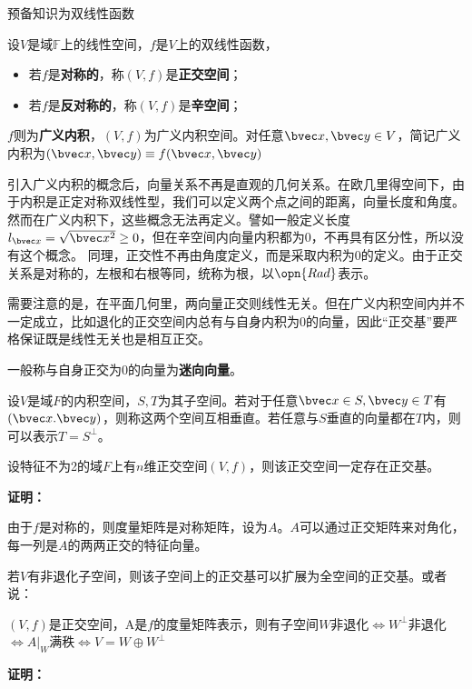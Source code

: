 

\begin{issues}
\issueDraft 预备知识为双线性函数
\end{issues}

\begin{definition}{}
设$V$是域$\mathbb F$上的线性空间，$f$是$V$上的双线性函数，
\begin{itemize}
\item 若$f$是\textbf{对称的}，称$(V,f)$是\textbf{正交空间}；
\item 若$f$是\textbf{反对称的}，称$(V,f)$是\textbf{辛空间}；
\end{itemize}
$f$则为\textbf{广义内积}，$(V,f)$为广义内积空间。对任意$\bvec x,\bvec y\in V$，简记广义内积为$(\bvec x,\bvec y)\equiv f(\bvec x,\bvec y)$
\end{definition}
引入广义内积的概念后，向量关系不再是直观的几何关系。在欧几里得空间下，由于内积是正定对称双线性型，我们可以定义两个点之间的距离，向量长度和角度。然而在广义内积下，这些概念无法再定义。譬如一般定义长度$l_{\bvec x}=\sqrt{\bvec x^2}\ge 0$，但在辛空间内向量内积都为0，不再具有区分性，所以没有这个概念。
同理，正交性不再由角度定义，而是采取内积为$0$的定义。由于正交关系是对称的，左根和右根等同，统称为根，以$\opn{Rad}$表示。

需要注意的是，在平面几何里，两向量正交则线性无关。但在广义内积空间内并不一定成立，比如退化的正交空间内总有与自身内积为0的向量，因此“正交基”要严格保证既是线性无关也是相互正交。

一般称与自身正交为$0$的向量为\textbf{迷向向量}。

\begin{definition}{}
设$V$是域$F$的内积空间，$S,T$为其子空间。若对于任意$\bvec x\in S,\bvec  y\in T$有$(\bvec x.\bvec y)$，则称这两个空间互相垂直。若任意与$S$垂直的向量都在$T$内，则可以表示$T=S^{\bot}$。
\end{definition}
\begin{theorem}{}
设特征不为2的域$F$上有$n$维正交空间$(V,f)$，则该正交空间一定存在正交基。
\end{theorem}
\textbf{证明：}

由于$f$是对称的，则度量矩阵是对称矩阵，设为$A$。$A$可以通过正交矩阵来对角化，每一列是$A$的两两正交的特征向量。

若$V$有非退化子空间，则该子空间上的正交基可以扩展为全空间的正交基。或者说：

\begin{theorem}{}
$(V,f)$是正交空间，A是$f$的度量矩阵表示，则有子空间$W$非退化$\Longleftrightarrow  W^{\bot}$非退化$\Longleftrightarrow A|_{W}$满秩$\Longleftrightarrow V=W\oplus W^{\bot} $
\end{theorem}
\textbf{证明：}

